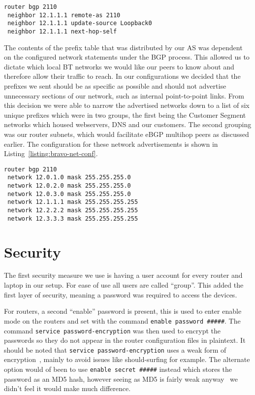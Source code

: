 \begin{lstlisting}[caption={Bravo-Alpha iBGP Configuration}, label={listing:bravo-ibgp-conf}]
router bgp 2110
 neighbor 12.1.1.1 remote-as 2110
 neighbor 12.1.1.1 update-source Loopback0
 neighbor 12.1.1.1 next-hop-self
\end{lstlisting}

The contents of the prefix table that was distributed by our AS was dependent
on the configured network statements under the BGP process. This allowed us to
dictate which local BT networks we would like our peers to know about and
therefore allow their traffic to reach. In our configurations we decided that
the prefixes we sent should be as specific as possible and should not advertise
unnecessary sections of our network, such as internal point-to-point links.
From this decision we were able to narrow the advertised networks down to a
list of six unique prefixes which were in two groups, the first being the
Customer Segment networks which housed webservers, DNS and our customers. The
second grouping was our router subnets, which would facilitate eBGP multihop
peers as discussed earlier. The configuration for these network advertisements
is shown in Listing~\ref{listing:bravo-net-conf}.

\begin{lstlisting}[caption={Bravo BGP Network Configuration}, label={listing:bravo-net-conf}]
router bgp 2110
 network 12.0.1.0 mask 255.255.255.0
 network 12.0.2.0 mask 255.255.255.0
 network 12.0.3.0 mask 255.255.255.0
 network 12.1.1.1 mask 255.255.255.255
 network 12.2.2.2 mask 255.255.255.255
 network 12.3.3.3 mask 255.255.255.255
\end{lstlisting}

\section{Security}
The first security measure we use is having a user account for every router and
laptop in our setup. For ease of use all users are called ``group''. This added
the first layer of security,  meaning a password was required to access the
devices.

For routers, a second ``enable'' password is present, this is used to enter
enable mode on the routers and set with the command \texttt{enable password
\#\#\#\#\#}. The command \texttt{service password-encryption} was then used to
encrypt the passwords so they do not appear in the router configuration files
in plaintext. It should be noted that \texttt{service password-encryption} uses
a weak form of encryption~\cite{ciscocracker}, mainly to avoid issues like
should-surfing for example. The alternate option would of been to use
\texttt{enable secret \#\#\#\#\#} instead which stores the password as an MD5
hash, however seeing as MD5 is fairly weak anyway~\cite{md5} we didn't feel it
would make much difference.


